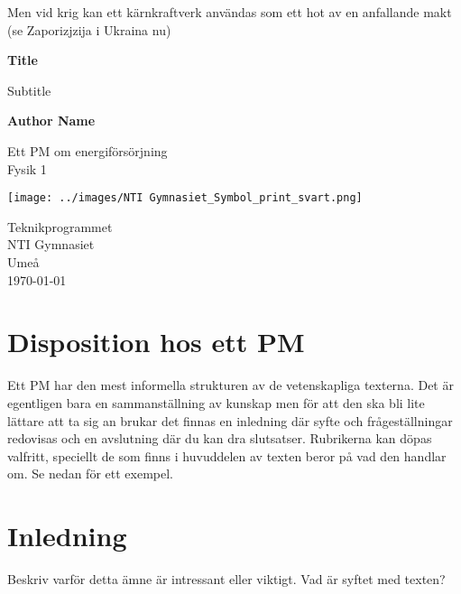 \documentclass[11p]{article}
\begin{document}
    Men vid krig kan ett kärnkraftverk användas som ett hot av en anfallande makt (se Zaporizjzija i Ukraina nu)
    \begin{titlepage}
        \begin{center}
            \vspace*{1cm}

            \Huge
            \textbf{Title}

            \vspace{0.5cm}
            \LARGE
            Subtitle

            \vspace{1.5cm}

            \textbf{Author Name}

            \vfill

            Ett PM om energiförsörjning \\
            Fysik 1

            \vspace{0.8cm}

            \texttt{[image: ../images/NTI Gymnasiet\_Symbol\_print\_svart.png]}

            \Large
            Teknikprogrammet\\
            NTI Gymnasiet\\
            Umeå\\
            \today

        \end{center}
    \end{titlepage}
    \tableofcontents
    \newpage
    
    \section{Disposition hos ett PM}
    Ett PM har den mest informella strukturen av de vetenskapliga texterna. Det är egentligen bara en sammanställning av kunskap men för att den ska bli lite lättare att ta sig an brukar det finnas en inledning där syfte och frågeställningar redovisas och en avslutning där du kan dra slutsatser. Rubrikerna kan döpas valfritt, speciellt de som finns i huvuddelen av texten beror på vad den handlar om. Se nedan för ett exempel.

    \section{Inledning}
    Beskriv varför detta ämne är intressant eller viktigt. Vad är syftet med texten?
\end{document}

